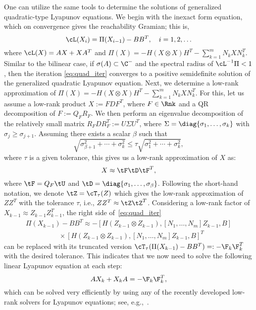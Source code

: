 One can utilize the same tools to determine  the solutions of generalized quadratic-type Lyapunov equations. We begin with the inexact form equation, which on convergence gives the reachability Gramian; this is,
\begin{equation}
\label{eq:quad_iter}
\cL(X_i) = \Pi(X_{i-1}) - BB^T,\quad i = 1,2,\ldots
\end{equation}
where $\cL(X) = AX + XA^T$ and $\Pi(X) = -H(X\otimes X)H^T-\sum_{k=1}^mN_kXN_k^T$. Similar to the bilinear case, if $\sigma(A) \subset \C^{-}$ and the spectral radius of $\cL^{-1}\Pi<1$, then the iteration \eqref{eq:quad_iter} converges to a positive semidefinite solution  of the generalized quadratic Lyapunov equation. Next, we determine a low-rank approximation of $\Pi(X) = -H(X\otimes X)H^T-\sum_{k=1}^mN_kXN_k^T$. For this, let us assume a low-rank product $X := FDF^T$, where $F \in \Rnk$ and a QR decomposition of $F := Q_FR_F$. We then perform an eigenvalue decomposition of the relatively small matrix $R_FDR_F^T := U\Sigma U^T$, where $\Sigma = \diag{\sigma_1,\ldots,\sigma_k}$ with $\sigma_j \geq \sigma_{j+1}$.  Assuming there exists a scalar $\beta$ such that
 $$\sqrt{\sigma_{\beta+1}^2+\cdots +\sigma_k^2} \leq \tau \sqrt{\sigma_1^2+\cdots +\sigma_k^2},$$
where $\tau$ is a given tolerance, this gives us a low-rank approximation of $X$ as:
$$X \approx \tF\tD\tF^T,$$
where $\tF = Q_F \tU$ and $\tD = \diag{\sigma_1,\ldots,\sigma_\beta}$. Following the short-hand notation, we denote $\tZ = \cT_\tau (Z)$ which gives the low-rank approximation of $ZZ^T$ with the tolerance $\tau$, i.e., $ZZ^T \approx \tZ\tZ^T$. Considering a low-rank factor of $X_{k-1} \approx Z_{k-1}Z_{k-1}^T$,  the right side of~\eqref{eq:quad_iter}
\begin{multline*}
\Pi(X_{k-1}) - BB^T \approx -[H(Z_{k-1} \otimes Z_{k-1}), \left[N_1,\ldots,N_m\right]Z_{k-1}, B ]\\
\hspace{2cm}\times[H(Z_{k-1} \otimes Z_{k-1}), \left[N_1,\ldots,N_m\right]Z_{k-1}, B ]^T
\end{multline*}
can be replaced with its truncated version $\cT_\tau (\Pi(X_{k-1}) - BB^T) =: -\F_k\F_k^T$ with the desired tolerance. This indicates that we now need to solve the following linear Lyapunov equation at each step:
\begin{equation}\label{eq:quad_ite_approx}
AX_k + X_kA = -\F_k\F_k^T,
\end{equation}
 which can be solved very efficiently by using any of the recently developed low-rank solvers for Lyapunov equations; see, e.g.,~\cite{benner2013numerical,simoncini2013computational}.  
